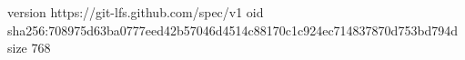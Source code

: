 version https://git-lfs.github.com/spec/v1
oid sha256:708975d63ba0777eed42b57046d4514c88170c1c924ec714837870d753bd794d
size 768

